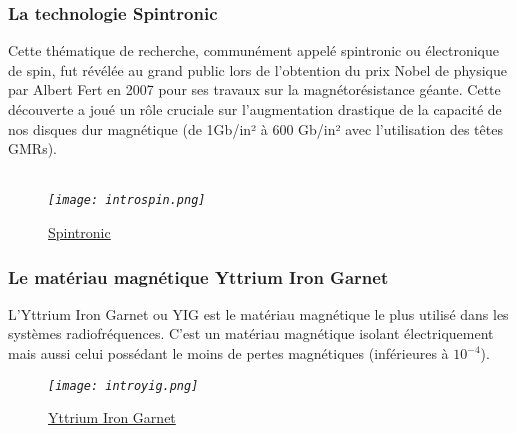 \documentclass[12pt,fleqn]{book} %
\begin{document}
\subsubsection{La technologie Spintronic}
\noindent Cette thématique de recherche, communément appelé spintronic ou électronique de
spin, fut révélée au grand public lors de l’obtention du prix Nobel de physique par Albert
Fert en 2007 pour ses travaux sur la magnétorésistance géante. Cette découverte
a joué un rôle cruciale sur l’augmentation drastique de la capacité de nos disques dur
magnétique (de 1Gb/in² à 600 Gb/in² avec l'utilisation des têtes GMRs).
~\\\\
\begin{figure}[H]
	\centering
	\itshape
	\texttt{[image: introspin.png]}
	\caption{\label{introspin} \underline{Spintronic}}
\end{figure}
\subsubsection{Le matériau magnétique Yttrium Iron Garnet}
\noindent L'Yttrium Iron Garnet ou YIG est le matériau magnétique le plus utilisé dans les systèmes radiofréquences. C'est un matériau magnétique isolant électriquement mais aussi celui possédant le moins de pertes magnétiques (inférieures à $10^{-4}$).
\begin{figure}[H]
	\centering
	\itshape
	\texttt{[image: introyig.png]}
	\caption{\label{introspin} \underline{Yttrium Iron Garnet}}
\end{figure}
\end{document}

